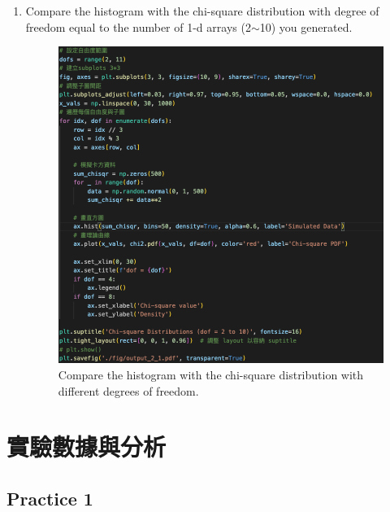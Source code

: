 \documentclass[12pt,a4paper]{article}
\begin{document}
\begin{CJK}{UTF8}{bkai}
\begin{enumerate}
    \item Compare the histogram with the chi-square distribution with degree of freedom equal to the number of 1-d arrays (2\(\sim\)10) you generated.
    \begin{figure}[h]
        \centering
        \includegraphics[width=1\linewidth]{figures/code/code_2_5.png}
        \caption{Compare the histogram with the chi-square distribution with different degrees of freedom.}
        \label{fig:code_2_5}
    \end{figure}
\end{enumerate}


\clearpage
\section{實驗數據與分析}
\hfill

\subsection{Practice 1}


\end{CJK}
\end{document}
